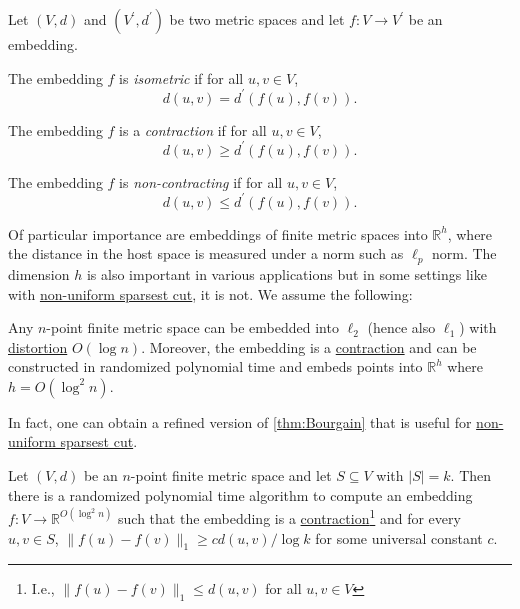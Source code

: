 \begin{definition*}
	Let \((V, d)\) and \((V^{\prime} , d^{\prime} )\) be two metric spaces and let \(f \colon V \to V^{\prime} \) be an embedding.
	\begin{definition}\label{def:isometric-embedding}
		The embedding \(f\) is \emph{isometric} if for all \(u, v \in V\),
		\[
			d(u, v) = d^{\prime} (f(u), f(v)).
		\]
	\end{definition}
	\begin{definition}[Contraction]\label{def:contraction}
		The embedding \(f\) is a \emph{contraction} if for all \(u, v \in V\),
		\[
			d(u, v) \geq d^{\prime} (f(u), f(v)).
		\]
	\end{definition}
	\begin{definition}\label{def:non-contracting}
		The embedding \(f\) is \emph{non-contracting} if for all \(u, v \in V\),
		\[
			d(u, v) \leq d^{\prime} (f(u), f(v)).
		\]
	\end{definition}
\end{definition*}

Of particular importance are embeddings of finite metric spaces into \(\mathbb{R} ^h\), where the distance in the host space is measured under a norm such as \(\ell _p\) norm. The dimension \(h\) is also important in various applications but in some settings like with \hyperref[prb:non-uniform-sparsest-cut]{non-uniform sparsest cut}, it is not. We assume the following:

\begin{theorem}[Bourgain]\label{thm:Bourgain}
	Any \(n\)-point finite metric space can be embedded into \(\ell _2\) (hence also \(\ell _1\)) with \hyperref[def:distortion]{distortion} \(O(\log n)\). Moreover, the embedding is a \hyperref[def:contraction]{contraction} and can be constructed in randomized polynomial time and embeds points into \(\mathbb{R} ^h\) where \(h = O(\log ^2 n)\).
\end{theorem}

In fact, one can obtain a refined version of \autoref{thm:Bourgain} that is useful for \hyperref[prb:non-uniform-sparsest-cut]{non-uniform sparsest cut}.

\begin{theorem}[Bourgain]\label{thm:Borugain*}
	Let \((V, d)\) be an \(n\)-point finite metric space and let \(S \subseteq V\) with \(\lvert S \rvert = k\). Then there is a randomized polynomial time algorithm to compute an embedding \(f \colon V \to \mathbb{R} ^{O(\log ^2 n)}\) such that the embedding is a \hyperref[def:contraction]{contraction}\footnote{I.e., \(\lVert f(u) - f(v) \rVert _1 \leq d(u, v)\) for all \(u, v \in V\)} and for every \(u, v \in S\), \(\lVert f(u) - f(v) \rVert _1 \geq c d(u, v) / \log k\) for some universal constant \(c\).
\end{theorem}

